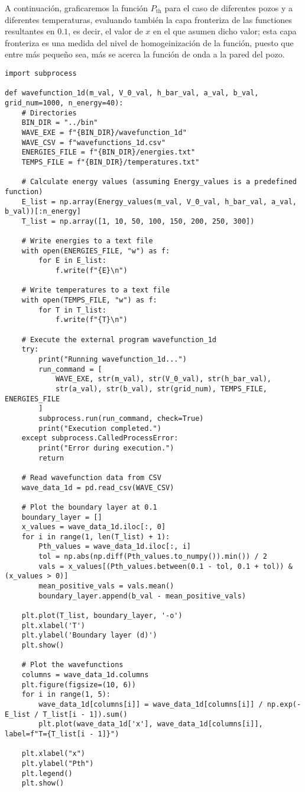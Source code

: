 \documentclass[11pt]{article}
\begin{document}
A continuación, graficaremos la función \(P_\text{th}\) para el caso de diferentes
pozos y a diferentes temperaturas, evaluando también la capa fronteriza de las
functiones resultantes en \(0.1\), es decir, el valor de \(x\) en el que asumen
dicho valor; esta capa fronteriza es una medida del nivel de homogeinización de
la función, puesto que entre más pequeño sea, más se acerca la función de onda a
la pared del pozo.
\begin{verbatim}
import subprocess

def wavefunction_1d(m_val, V_0_val, h_bar_val, a_val, b_val, grid_num=1000, n_energy=40):
    # Directories
    BIN_DIR = "../bin"
    WAVE_EXE = f"{BIN_DIR}/wavefunction_1d"
    WAVE_CSV = f"wavefunctions_1d.csv"
    ENERGIES_FILE = f"{BIN_DIR}/energies.txt"
    TEMPS_FILE = f"{BIN_DIR}/temperatures.txt"

    # Calculate energy values (assuming Energy_values is a predefined function)
    E_list = np.array(Energy_values(m_val, V_0_val, h_bar_val, a_val, b_val))[:n_energy]
    T_list = np.array([1, 10, 50, 100, 150, 200, 250, 300])

    # Write energies to a text file
    with open(ENERGIES_FILE, "w") as f:
        for E in E_list:
            f.write(f"{E}\n")

    # Write temperatures to a text file
    with open(TEMPS_FILE, "w") as f:
        for T in T_list:
            f.write(f"{T}\n")

    # Execute the external program wavefunction_1d
    try:
        print("Running wavefunction_1d...")
        run_command = [
            WAVE_EXE, str(m_val), str(V_0_val), str(h_bar_val),
            str(a_val), str(b_val), str(grid_num), TEMPS_FILE, ENERGIES_FILE
        ]
        subprocess.run(run_command, check=True)
        print("Execution completed.")
    except subprocess.CalledProcessError:
        print("Error during execution.")
        return

    # Read wavefunction data from CSV
    wave_data_1d = pd.read_csv(WAVE_CSV)

    # Plot the boundary layer at 0.1
    boundary_layer = []
    x_values = wave_data_1d.iloc[:, 0]
    for i in range(1, len(T_list) + 1):
        Pth_values = wave_data_1d.iloc[:, i]
        tol = np.abs(np.diff(Pth_values.to_numpy()).min()) / 2
        vals = x_values[(Pth_values.between(0.1 - tol, 0.1 + tol)) & (x_values > 0)]
        mean_positive_vals = vals.mean()
        boundary_layer.append(b_val - mean_positive_vals)

    plt.plot(T_list, boundary_layer, '-o')
    plt.xlabel('T')
    plt.ylabel('Boundary layer (d)')
    plt.show()

    # Plot the wavefunctions
    columns = wave_data_1d.columns
    plt.figure(figsize=(10, 6))
    for i in range(1, 5):
        wave_data_1d[columns[i]] = wave_data_1d[columns[i]] / np.exp(-E_list / T_list[i - 1]).sum()
        plt.plot(wave_data_1d['x'], wave_data_1d[columns[i]], label=f"T={T_list[i - 1]}")

    plt.xlabel("x")
    plt.ylabel("Pth")
    plt.legend()
    plt.show()
\end{verbatim}
\end{document}
